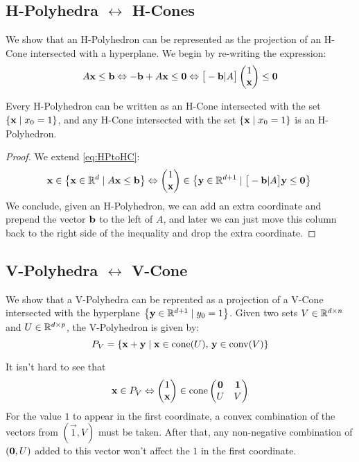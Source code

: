 \subsection{H-Polyhedra $\leftrightarrow$ H-Cones}
We show that an H-Polyhedron can be represented as the projection of an H-Cone intersected with a hyperplane.  We begin by re-writing the expression:
\begin{equation}\label{eq:HPtoHC}
  A\x \leq \b \Leftrightarrow -\b + A\x \leq \0 \Leftrightarrow
     \big[-\b|A\big]\onex \leq \0 
\end{equation}

\begin{Prop}
  Every H-Polyhedron can be written as an H-Cone intersected with the set $\left\{\mathbf{x}\;|\; x_0 = 1\right\}$, and any H-Cone intersected with the set $\left\{\mathbf{x}\;|\; x_0 = 1\right\}$ is an H-Polyhedron.
\end{Prop}
\begin{proof}
We extend \eqref{eq:HPtoHC}:
\[ \x \in \set{\xv \st A\x \leq \b} \Leftrightarrow
   \onex \in \set{\yv \st \big[-\b|A\big]\y \leq \0}\\
\]
We conclude, given an H-Polyhedron, we can add an extra coordinate and prepend the vector $\mathbf{b}$ to the left of $A$, and later we can just move this column back to the right side of the inequality and drop the extra coordinate.
\end{proof}

\subsection{V-Polyhedra $\leftrightarrow$ V-Cone}

We show that a V-Polyhedra can be reprented as a projection of a V-Cone intersected with the hyperplane $\left\{\mathbf{y} \in \mathbb{R}^{d+1} \;|\; y_0 = 1\right\}$.  Given two sets $V \in \mathbb{R}^{d\times n}$ and $U \in \mathbb{R}^{d\times p}$, the V-Polyhedron is given by:
  \[ P_V = \left\{\mathbf{x} + \mathbf{y} \;|\; \mathbf{x} \in \operatorname{cone}(U),\, \mathbf{y} \in \operatorname{conv}(V)\right\} \]

It isn't hard to see that
  \[ \x \in P_V \Leftrightarrow \onex \in \cone\lcone \]
For the value $1$ to appear in the first coordinate, a convex combination of the vectors from $(\vec{1}, V)$ must be taken.  After that, any non-negative combination of $(\mathbf{0},U)$ added to this vector won't affect the $1$ in the first coordinate.

